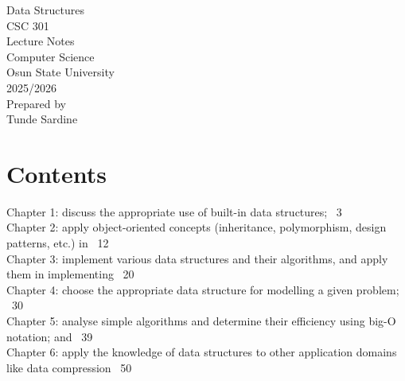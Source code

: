 \documentclass[12pt]{report}
\begin{document}
\begin{titlepage}
\thispagestyle{empty}
\centering
\vspace*{2cm}
{\LARGE Data Structures}\\[1cm]
{\Large CSC 301}\\[1cm]
{\Large Lecture Notes}\\[1.5cm]
Computer Science\\
Osun State University\\
2025/2026\\[2cm]
Prepared by\\
Tunde Sardine
\end{titlepage}

\pagestyle{plain}
\chapter*{Contents}
\vspace{0.5em}
\noindent
Chapter 1: discuss the appropriate use of built-in data structures; \dotfill\ 3\\[0.6em]
Chapter 2: apply object-oriented concepts (inheritance, polymorphism, design patterns, etc.) in \dotfill\ 12\\[0.6em]
Chapter 3: implement various data structures and their algorithms, and apply them in implementing \dotfill\ 20\\[0.6em]
Chapter 4: choose the appropriate data structure for modelling a given problem; \dotfill\ 30\\[0.6em]
Chapter 5: analyse simple algorithms and determine their efficiency using big-O notation; and \dotfill\ 39\\[0.6em]
Chapter 6: apply the knowledge of data structures to other application domains like data compression \dotfill\ 50\\[0.6em]
\end{document}
